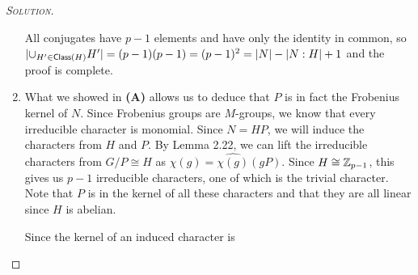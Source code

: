 \begin{proof}[{\scshape Solution}]
\begin{enumerate}[font=\normalfont,label=\textbf{(\Alph*)}, wide]
    All conjugates have $p-1$ elements and have only the identity in common, so $\lvert \cup_{H' \in \mathsf{Class}(H)} H' \rvert = (p-1)(p-1) = (p-1)^2 = \lvert N \rvert - \lvert N : H\rvert + 1$ and the proof is complete.

    \item
    \begin{comment}
    In $S_p$, it holds that two elements are conjugate iff they have the same cycle type. It follows that two conjugate elements in $N$ necesarily have the same cycle type.
  \end{comment}
    \begin{comment}
    We found in \textbf{(A)} that the number of elements conjugate to some element in $H$ is $(p-1)^2$.
  \end{comment}
  \begin{comment}
    Each element of $H$ has a single element in each conjugate of $H$, since the conjugates are all isomorphic. There are $p$ conjugates of $H$ (including $H$), so each conjugacy class arising from here will have $kp$ elements. Together, there will be $(p-1)^2$ elements going into conjugacy classes arising in this way, leaving $p-1$ elements of $g$ to be considered, which are definitely not in any conjugacy class of an element in $H$.
\end{comment}

What we showed in \textbf{(A)} allows us to deduce that $P$ is in fact the Frobenius kernel of $N$. Since Frobenius groups are $M$-groups, we know that every irreducible character is monomial. Since $N = HP$, we will induce the characters from $H$ and $P$. By Lemma 2.22, we can lift the irreducible characters from $G/P \cong H$ as $\chi(g) = \hat{\chi(g)}(gP)$. Since $H \cong \mathbb{Z}_{p-1}$, this gives us $p-1$ irreducible characters, one of which is the trivial character. Note that $P$ is in the kernel of all these characters and that they are all linear since $H$ is abelian.

Since the kernel of an induced character is

\begin{comment}
We use Theorem 8.2.14 in the course notes which states that if $\chi \in \Irr(H)$ is nontrivial and irreducible, then $\tilde{\chi} = \Ind^N_H(\chi) + \chi(1)(\triv_N-\Ind^G_H\triv_H)$ is an irreducible character of $N$ that extends $\chi$. Since $H$ is cyclic, it has all linear characters. In fact, the characters of $H$ are those of $\Z_{p-1}$. This gives us $p-2$ nontrivial characters in $N$.
\end{comment}


\end{enumerate}
\end{proof}
